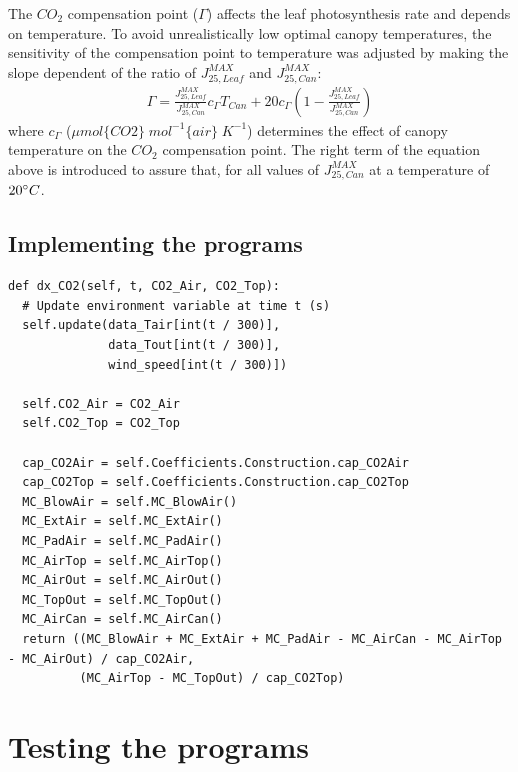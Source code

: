 \documentclass[a4paper]{article}
\begin{document}
The \(CO_2\) compensation point (\(\Gamma\)) affects the leaf photosynthesis rate and depends on temperature. To avoid unrealistically low optimal canopy temperatures, the sensitivity of the compensation point to temperature was adjusted by making the slope dependent of the ratio of \(J^{MAX}_{25,Leaf}\) and \(J^{MAX}_{25,Can}\):
\begin{align}
  \Gamma = \frac{J^{MAX}_{25,Leaf}}{J^{MAX}_{25,Can}}c_{\Gamma} T_{Can} + 20 c_{\Gamma} \left(1-\frac{J^{MAX}_{25,Leaf}}{J^{MAX}_{25,Can}}\right)
\end{align}
where \(c_{\Gamma}\) (\(\mu mol\{CO2\}\;mol^{-1}\{air\}\;K^{-1}\)) determines the effect of canopy temperature on the \(CO_2\) compensation point. The right term of the equation above is introduced to assure that, for all values of \(J^{MAX}_{25,Can}\) at a temperature of \(20 \degree C\).

\subsection{Implementing the programs}
\begin{mdframed}[leftline=false,rightline=false,backgroundcolor=magenta!10]
  \begin{verbatim}
def dx_CO2(self, t, CO2_Air, CO2_Top):
  # Update environment variable at time t (s)
  self.update(data_Tair[int(t / 300)],
              data_Tout[int(t / 300)],
              wind_speed[int(t / 300)])

  self.CO2_Air = CO2_Air
  self.CO2_Top = CO2_Top

  cap_CO2Air = self.Coefficients.Construction.cap_CO2Air
  cap_CO2Top = self.Coefficients.Construction.cap_CO2Top
  MC_BlowAir = self.MC_BlowAir()
  MC_ExtAir = self.MC_ExtAir()
  MC_PadAir = self.MC_PadAir()
  MC_AirTop = self.MC_AirTop()
  MC_AirOut = self.MC_AirOut()
  MC_TopOut = self.MC_TopOut()
  MC_AirCan = self.MC_AirCan()
  return ((MC_BlowAir + MC_ExtAir + MC_PadAir - MC_AirCan - MC_AirTop - MC_AirOut) / cap_CO2Air,
          (MC_AirTop - MC_TopOut) / cap_CO2Top)
  \end{verbatim}
\end{mdframed}



\newpage
\section{Testing the programs}
\end{document}
